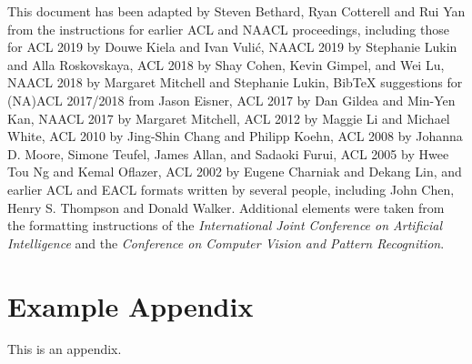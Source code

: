 \documentclass[11pt]{article}
\begin{document}
This document has been adapted
by Steven Bethard, Ryan Cotterell and Rui Yan
from the instructions for earlier ACL and NAACL proceedings, including those for
ACL 2019 by Douwe Kiela and Ivan Vuli\'{c},
NAACL 2019 by Stephanie Lukin and Alla Roskovskaya,
ACL 2018 by Shay Cohen, Kevin Gimpel, and Wei Lu,
NAACL 2018 by Margaret Mitchell and Stephanie Lukin,
Bib\TeX{} suggestions for (NA)ACL 2017/2018 from Jason Eisner,
ACL 2017 by Dan Gildea and Min-Yen Kan,
NAACL 2017 by Margaret Mitchell,
ACL 2012 by Maggie Li and Michael White,
ACL 2010 by Jing-Shin Chang and Philipp Koehn,
ACL 2008 by Johanna D. Moore, Simone Teufel, James Allan, and Sadaoki Furui,
ACL 2005 by Hwee Tou Ng and Kemal Oflazer,
ACL 2002 by Eugene Charniak and Dekang Lin,
and earlier ACL and EACL formats written by several people, including
John Chen, Henry S. Thompson and Donald Walker.
Additional elements were taken from the formatting instructions of the \emph{International Joint Conference on Artificial Intelligence} and the \emph{Conference on Computer Vision and Pattern Recognition}.

%


\appendix

\section{Example Appendix}
\label{sec:appendix}

This is an appendix.
\end{document}
